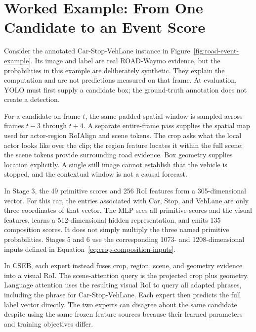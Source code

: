 \section{Worked Example: From One Candidate to an Event Score}
\label{sec:worked-candidate}

Consider the annotated Car-Stop-VehLane instance in Figure~\ref{fig:road-event-example}. Its image and label are real ROAD-Waymo evidence, but the probabilities in this example are deliberately synthetic. They explain the computation and are not predictions measured on that frame. At evaluation, YOLO must first supply a candidate box; the ground-truth annotation does not create a detection.

For a candidate on frame \(t\), the same padded spatial window is sampled across frames \(t-3\) through \(t+4\). A separate entire-frame pass supplies the spatial map used for actor-region RoIAlign and scene tokens. The crop asks what the local actor looks like over the clip; the region feature locates it within the full scene; the scene tokens provide surrounding road evidence. Box geometry supplies location explicitly. A single still image cannot establish that the vehicle is stopped, and the contextual window is not a causal forecast.

In Stage 3, the 49 primitive scores and 256 RoI features form a 305-dimensional vector. For this car, the entries associated with Car, Stop, and VehLane are only three coordinates of that vector. The MLP sees all primitive scores and the visual features, learns a 512-dimensional hidden representation, and emits 135 composition scores. It does not simply multiply the three named primitive probabilities. Stages 5 and 6 use the corresponding 1073- and 1208-dimensional inputs defined in Equation~\ref{eq:crop-composition-inputs}.

In CSEB, each expert instead fuses crop, region, scene, and geometry evidence into a visual RoI. The scene-attention query is the projected crop plus geometry. Language attention uses the resulting visual RoI to query all adapted phrases, including the phrase for Car-Stop-VehLane. Each expert then predicts the full label vector directly. The two experts can disagree about the same candidate despite using the same frozen feature sources because their learned parameters and training objectives differ.

